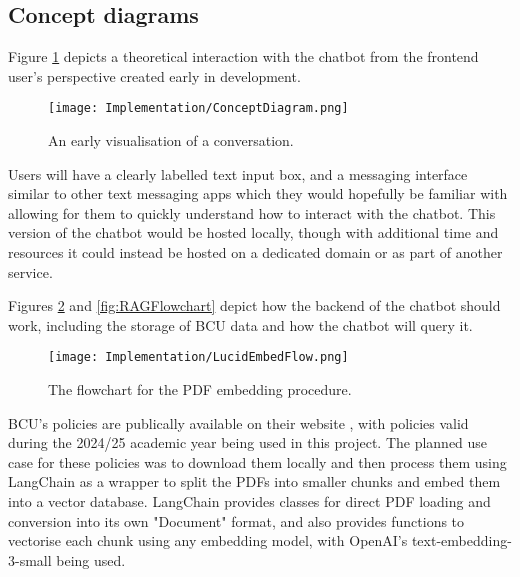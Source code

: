 

\subsection{Concept diagrams}

Figure \ref{fig:ConceptDiagram} depicts a theoretical interaction with the chatbot from the frontend user's perspective created 
early in development.

\begin{figure}[H]
    \centering
    \texttt{[image: Implementation/ConceptDiagram.png]}
    \caption{An early visualisation of a conversation.\label{fig:ConceptDiagram}}
\end{figure}

\noindent Users will have a clearly labelled text input box, and a messaging interface similar to other text messaging apps 
which they would hopefully be familiar with allowing for them to quickly understand how to interact with the chatbot.
This version of the chatbot would be hosted locally, though with additional time and resources it could instead be hosted on a 
dedicated domain or as part of another service.

\para Figures \ref{fig:EmbedFlowchart} and \ref{fig:RAGFlowchart} depict how the backend of the chatbot should work, including the 
storage of BCU data and how the chatbot will query it.

\begin{figure}[H]
    \centering
    \texttt{[image: Implementation/LucidEmbedFlow.png]}
    \caption{The flowchart for the PDF embedding procedure.\label{fig:EmbedFlowchart}}
\end{figure}

\noindent BCU's policies are publically available on their website \autocite{bcuPoliciesProcedures}, with policies valid during the 2024/25 academic
year being used in this project. The planned use case for these policies was to download them locally and then process them using LangChain as a 
wrapper to split the PDFs into smaller chunks and embed them into a vector database. LangChain provides classes for direct PDF loading and 
conversion into its own "Document" format, and also provides functions to vectorise each chunk using any embedding model, with OpenAI's 
text-embedding-3-small being used. 

